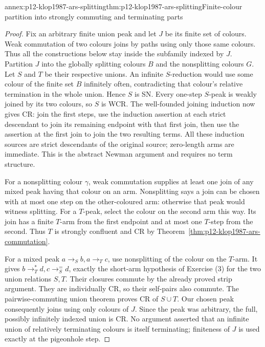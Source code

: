 \begin{annexitem}{annex:p12-klop1987-ars-splitting}{thm:p12-klop1987-ars-splitting}{Finite-colour partition into strongly commuting and terminating parts}
\begin{proof}
Fix an arbitrary finite union peak and let \(J\) be its finite set
of colours. Weak commutation of two colours joins by paths using
only those same colours. Thus all the constructions below stay inside
the subfamily indexed by \(J\).
Partition \(J\) into the globally splitting colours \(B\) and
the nonsplitting colours \(G\). Let \(S\) and \(T\) be their
respective unions. An infinite \(S\)-reduction would use some colour
of the finite set \(B\) infinitely often, contradicting that colour's
relative termination in the whole union. Hence \(S\) is SN.
Every one-step \(S\)-peak is weakly joined by its two colours, so
\(S\) is WCR. The well-founded joining induction now gives CR:
join the first steps, use the induction assertion at each strict
descendant to join its remaining endpoint with that first join, then
use the assertion at the first join to join the two resulting terms.
All these induction sources are strict descendants of the original
source; zero-length arms are immediate. This is the abstract Newman
argument and requires no term structure.

For a nonsplitting colour \(\gamma\), weak commutation supplies
at least one join of any mixed peak having that colour on an arm.
Nonsplitting says a join can be chosen with at most one step on the
other-coloured arm: otherwise that peak would witness splitting.
For a \(T\)-peak, select the colour on the second arm this way.
Its join has a finite \(T\)-arm from the first endpoint and at
most one \(T\)-step from the second. Thus \(T\) is strongly
confluent and CR by
Theorem~\ref{thm:p12-klop1987-ars-commutation}.

For a mixed peak \(a\to_Sb,a\to_Tc\), use nonsplitting of
the colour on the \(T\)-arm. It gives
\(b\to_T^*d,c\to_S^=d\), exactly the short-arm hypothesis
of Exercise (3) for the two union relations \(S,T\).
Their closures commute by the already proved strip argument.
They are individually CR, so their self-pairs also commute. The
pairwise-commuting union theorem proves CR of \(S\cup T\).
Our chosen peak consequently joins using only colours of \(J\).
Since the peak was arbitrary, the full, possibly infinitely indexed
union is CR. No argument asserted that an infinite union of relatively
terminating colours is itself terminating; finiteness of \(J\)
is used exactly at the pigeonhole step.
\end{proof}
\end{annexitem}

